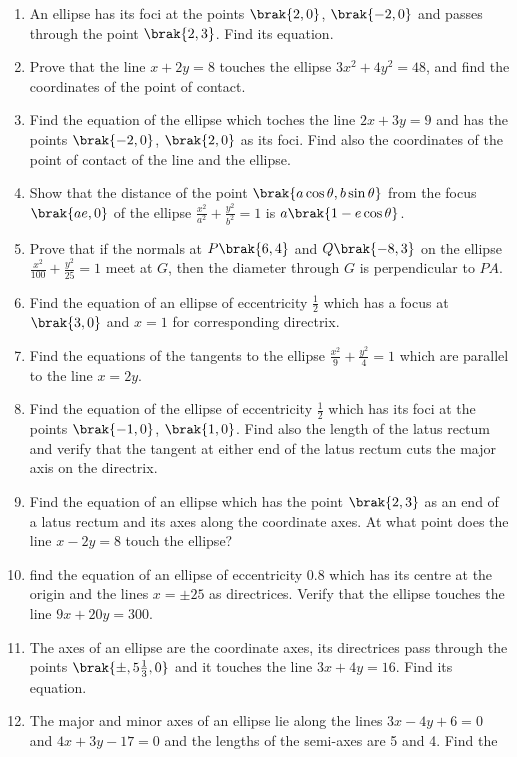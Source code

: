 \begin{enumerate}[1.]
\item An ellipse has its foci at the points $\brak{2,0}$, $\brak{-2,0}$
and passes through the point $\brak{2,3}$.  Find its equation.
\item Prove that the line $x+2y=8$ touches the ellipse $3x^2+4y^2=48$,
and find the coordinates of the point of contact.
\item Find the equation of the ellipse which toches the line $2x+3y=9$
and has the points $\brak{-2,0}$, $\brak{2,0}$ as its foci.  Find also
the coordinates of the point of contact of the line and the ellipse.
\item Show that the distance of the point $\brak{a\cos \theta,b\sin \theta}$
from the focus $\brak{ae,0}$ of the ellipse $\frac{x^2}{a^2}+\frac{y^2}{b^2}=1$
is $a\brak{1-e\cos\theta}$.  
\item Prove that if the normals at $P \brak{6,4}$ and $Q \brak{-8,3}$ on
the  ellipse $\frac{x^2}{100}+\frac{y^2}{25} = 1$ meet at $G$, then the 
diameter through $G$ is perpendicular to $PA$.  
\item Find the equation of an ellipse of eccentricity $\frac{1}{2}$ which has
a focus at $\brak{3,0}$ and $x=1$ for corresponding directrix.
\item Find the equations of the tangents to the ellipse $\frac{x^2}{9}+\frac{y^2}{4}=1$
which are parallel to the line $x=2y$.  
\item Find the equation of the ellipse of eccentricity $\frac{1}{2}$ which has
its foci at the points $\brak{-1,0}$, $\brak{1,0}$.  Find also the length
of the latus rectum and verify that the tangent at either end of the latus rectum
cuts the major axis on the directrix.
\item Find the equation of an ellipse which has the point $\brak{2,3}$ as an
end of a latus rectum and its axes along the coordinate axes.  At what point
does the line $x-2y=8$ touch the ellipse?
\item find the equation of an ellipse of eccentricity 0.8 which has its
centre at the origin and the lines $x= \pm 25$ as directrices.  Verify that
the ellipse touches the line $9x+20y=300$.
\item The axes of an ellipse are the coordinate axes, its directrices pass through
the points $\brak{\pm,5\frac{1}{3},0}$ and it touches the line $3x+4y=16$.  
Find its equation.
\item The major and minor axes of an ellipse lie along the lines $3x-4y+6=0$
and $4x+3y-17=0$ and the lengths of the semi-axes are 5 and 4.  Find the 

\end{enumerate}
